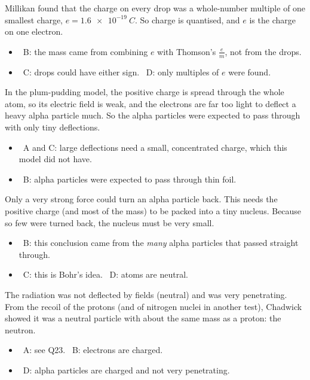 \documentclass[12pt]{article}
\begin{document}
\begin{practiceanswers}
\begin{practiceans}
  Millikan found that the charge on every drop was a whole-number multiple of one smallest charge,
  $e = \qty{1.6e-19}{C}$. So charge is quantised, and $e$ is the charge on one electron.
  \begin{itemize}
    \item \xmark\ B: the mass came from combining $e$ with Thomson's $\frac{e}{m}$, not from the drops.
    \item \xmark\ C: drops could have either sign. \quad \xmark\ D: only multiples of $e$ were found.
  \end{itemize}
\end{practiceans}

\begin{practiceans}
  In the plum-pudding model, the positive charge is spread through the whole atom, so its electric field
  is weak, and the electrons are far too light to deflect a heavy alpha particle much. So the alpha
  particles were expected to pass through with only tiny deflections.
  \begin{itemize}
    \item \xmark\ A and C: large deflections need a small, concentrated charge, which this model did not
          have.
    \item \xmark\ B: alpha particles were expected to pass through thin foil.
  \end{itemize}
\end{practiceans}

\begin{practiceans}
  Only a very strong force could turn an alpha particle back. This needs the positive charge (and most of
  the mass) to be packed into a tiny nucleus. Because so few were turned back, the nucleus must be very
  small.
  \begin{itemize}
    \item \xmark\ B: this conclusion came from the \emph{many} alpha particles that passed straight
          through.
    \item \xmark\ C: this is Bohr's idea. \quad \xmark\ D: atoms are neutral.
  \end{itemize}
\end{practiceans}

\begin{practiceans}
  The radiation was not deflected by fields (neutral) and was very penetrating. From the recoil of the
  protons (and of nitrogen nuclei in another test), Chadwick showed it was a neutral particle with about
  the same mass as a proton: the neutron.
  \begin{itemize}
    \item \xmark\ A: see Q23. \quad \xmark\ B: electrons are charged.
    \item \xmark\ D: alpha particles are charged and not very penetrating.
  \end{itemize}
\end{practiceans}


\end{practiceanswers}
\end{document}
